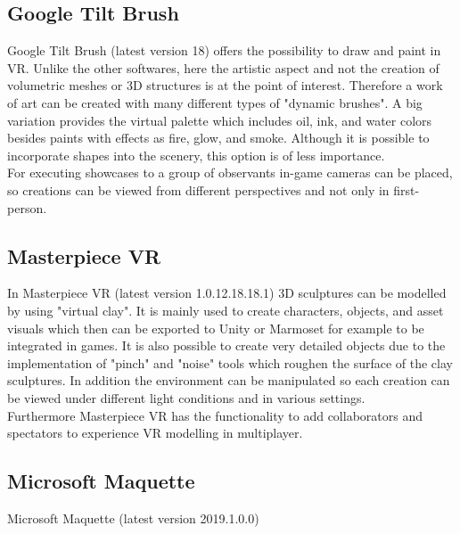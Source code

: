 \documentclass{report}
\begin{document}
		\subsection[Google Tilt Brush]{Google Tilt Brush \textsc{\small{\cite{GTB}}}}
			Google Tilt Brush (latest version 18) offers the possibility to draw and paint in VR. Unlike the other softwares, here the artistic aspect and not the creation of volumetric meshes or 3D structures is at the point of interest. Therefore a work of art can be created with many different types of "dynamic brushes". A big variation provides the virtual palette which includes oil, ink, and water colors besides paints with effects as fire, glow, and smoke. Although it is possible to incorporate shapes into the scenery, this option is of less importance. \\
			For executing showcases to a group of observants in-game cameras can be placed, so creations can be viewed from different perspectives and not only in first-person.
		\subsection[Masterpiece VR]{Masterpiece VR \textsc{\small{\cite{MVR}}}}
			In Masterpiece VR (latest version 1.0.12.18.18.1) 3D  sculptures can be modelled by using "virtual clay". It is mainly used to create characters, objects, and asset visuals which then can be exported to Unity or Marmoset for example to be integrated in games. It is also possible to create very detailed objects due to the implementation of "pinch" and "noise" tools which roughen the surface of the clay sculptures. In addition the environment can be manipulated so each creation can be viewed under different light conditions and in various settings. \\
			Furthermore Masterpiece VR has the functionality to add collaborators and spectators to experience VR modelling in multiplayer.
		\subsection[Microsoft Maquette]{Microsoft Maquette \textsc{\small{\cite{MSM}}}}
			Microsoft Maquette (latest version 2019.1.0.0) 
			
\end{document}
